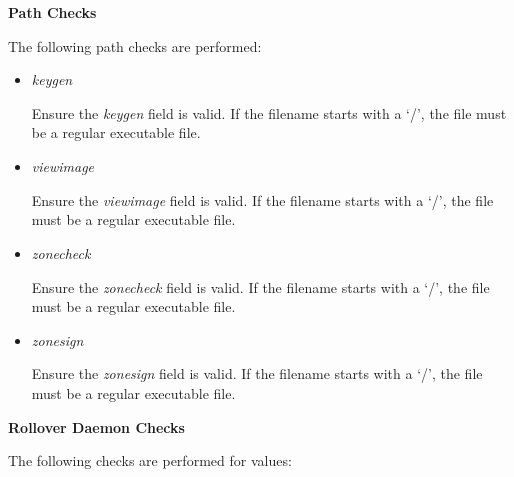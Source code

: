 {\bf Path Checks}

The following path checks are performed:

\begin{itemize}

\item {\it keygen}\verb" "

Ensure the {\it keygen} field is valid.  If the filename starts with a `/',
the file must be a regular executable file.

\item {\it viewimage}\verb" "

Ensure the {\it viewimage} field is valid.  If the filename starts with a `/',
the file must be a regular executable file.

\item {\it zonecheck}\verb" "

Ensure the {\it zonecheck} field is valid.  If the filename starts with a `/',
the file must be a regular executable file.

\item {\it zonesign}\verb" "

Ensure the {\it zonesign} field is valid.  If the filename starts with a `/',
the file must be a regular executable file.

\end{itemize}

{\bf Rollover Daemon Checks}

The following checks are performed for  values:

